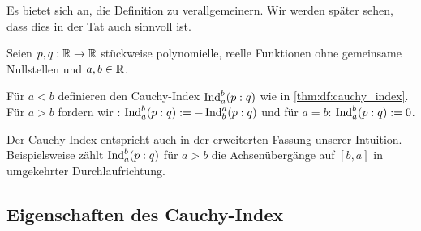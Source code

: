 \documentclass{mythesis}
\begin{document}
Es bietet sich an, die Definition zu verallgemeinern.
Wir werden später sehen, dass dies in der Tat auch sinnvoll ist.

\begin{definition}
    Seien $p, q: \mathbb{R} \to \mathbb{R}$ stückweise polynomielle, reelle Funktionen ohne gemeinsame Nullstellen und $a, b \in \mathbb{R}$.

    Für $a < b$ definieren den Cauchy-Index $\operatorname{Ind}_a^b(p:q)$ wie in \ref{thm:df:cauchy_index}.
    Für $a > b$ fordern wir : $\operatorname{Ind}_a^b(p:q) := -\operatorname{Ind}_b^a(p:q)$ und für $a = b$: $\operatorname{Ind}_a^b(p:q) := 0$.
\end{definition}

Der Cauchy-Index entspricht auch in der erweiterten Fassung unserer Intuition.
Beispielsweise zählt $\operatorname{Ind}_a^b(p:q)$ für $a > b$ die Achsenübergänge auf $[b, a]$ in umgekehrter Durchlaufrichtung.

%
%



\subsection{Eigenschaften des Cauchy-Index}
\end{document}
